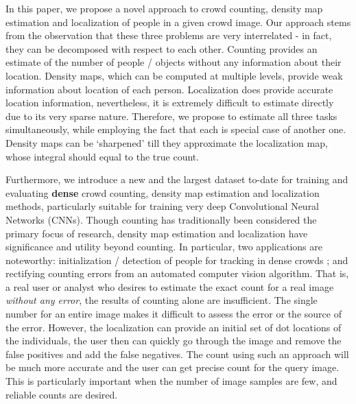 \documentclass[runningheads]{llncs}
\begin{document}
In this paper, we propose a novel approach to crowd counting, density map estimation and localization of people in a given crowd image. Our approach stems from the observation that these three problems are very interrelated - in fact, they can be decomposed with respect to each other. Counting provides an estimate of the number of people / objects without any information about their location. Density maps, which can be computed at multiple levels, provide weak information about location of each person. Localization does provide accurate location information, nevertheless, it is extremely difficult to estimate directly due to its very sparse nature. Therefore, we propose to estimate all three tasks simultaneously, while employing the fact that each is special case of another one. Density maps can be `sharpened' till they approximate the localization map, whose integral should equal to the true count.

Furthermore, we introduce a new and the largest dataset to-date for training and evaluating \textbf{dense} crowd counting, density map estimation and localization methods, particularly suitable for training very deep Convolutional Neural Networks (CNNs). Though counting has traditionally been considered the primary focus of research, density map estimation and localization have significance and utility beyond counting. In particular, two applications are noteworthy: initialization / detection of people for tracking in dense crowds \cite{idrees2014tracking}; and rectifying counting errors from an automated computer vision algorithm. That is, a real user or analyst who desires to estimate the exact count for a real image \textit{without any error}, the results of counting alone are insufficient. The single number for an entire image makes it difficult to assess the error or the source of the error. However, the localization can provide an initial set of dot locations of the individuals, the user then can quickly go through the image and remove the false positives and add the false negatives. The count using such an approach will be much more accurate and the user can get  precise count for the query image. This is particularly important when the number of image samples are few, and reliable counts are desired.
\end{document}
